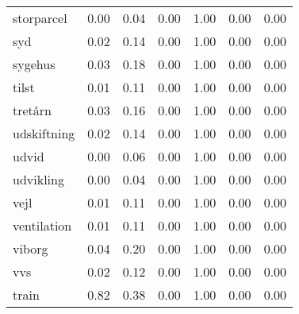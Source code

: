 \begin{landscape}
\begin{longtable}[h!]{lllllll}
storparcel & 0.00 & 0.04 & 0.00 & 1.00 & 0.00 & 0.00 \\
syd & 0.02 & 0.14 & 0.00 & 1.00 & 0.00 & 0.00 \\
sygehus & 0.03 & 0.18 & 0.00 & 1.00 & 0.00 & 0.00 \\
tilst & 0.01 & 0.11 & 0.00 & 1.00 & 0.00 & 0.00 \\
tretårn & 0.03 & 0.16 & 0.00 & 1.00 & 0.00 & 0.00 \\
udskiftning & 0.02 & 0.14 & 0.00 & 1.00 & 0.00 & 0.00 \\
udvid & 0.00 & 0.06 & 0.00 & 1.00 & 0.00 & 0.00 \\
udvikling & 0.00 & 0.04 & 0.00 & 1.00 & 0.00 & 0.00 \\
vejl & 0.01 & 0.11 & 0.00 & 1.00 & 0.00 & 0.00 \\
ventilation & 0.01 & 0.11 & 0.00 & 1.00 & 0.00 & 0.00 \\
viborg & 0.04 & 0.20 & 0.00 & 1.00 & 0.00 & 0.00 \\
vvs & 0.02 & 0.12 & 0.00 & 1.00 & 0.00 & 0.00 \\
train & 0.82 & 0.38 & 0.00 & 1.00 & 0.00 & 0.00 \\
\end{longtable}\end{landscape}
